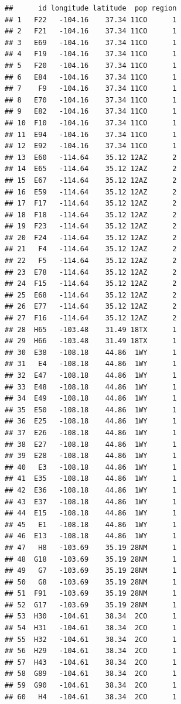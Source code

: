 \documentclass[]{article}
\begin{document}
\begin{verbatim}
##      id longitude latitude  pop region
## 1   F22   -104.16    37.34 11CO      1
## 2   F21   -104.16    37.34 11CO      1
## 3   E69   -104.16    37.34 11CO      1
## 4   F19   -104.16    37.34 11CO      1
## 5   F20   -104.16    37.34 11CO      1
## 6   E84   -104.16    37.34 11CO      1
## 7    F9   -104.16    37.34 11CO      1
## 8   E70   -104.16    37.34 11CO      1
## 9   E82   -104.16    37.34 11CO      1
## 10  F10   -104.16    37.34 11CO      1
## 11  E94   -104.16    37.34 11CO      1
## 12  E92   -104.16    37.34 11CO      1
## 13  E60   -114.64    35.12 12AZ      2
## 14  E65   -114.64    35.12 12AZ      2
## 15  E67   -114.64    35.12 12AZ      2
## 16  E59   -114.64    35.12 12AZ      2
## 17  F17   -114.64    35.12 12AZ      2
## 18  F18   -114.64    35.12 12AZ      2
## 19  F23   -114.64    35.12 12AZ      2
## 20  F24   -114.64    35.12 12AZ      2
## 21   F4   -114.64    35.12 12AZ      2
## 22   F5   -114.64    35.12 12AZ      2
## 23  E78   -114.64    35.12 12AZ      2
## 24  F15   -114.64    35.12 12AZ      2
## 25  E68   -114.64    35.12 12AZ      2
## 26  E77   -114.64    35.12 12AZ      2
## 27  F16   -114.64    35.12 12AZ      2
## 28  H65   -103.48    31.49 18TX      1
## 29  H66   -103.48    31.49 18TX      1
## 30  E38   -108.18    44.86  1WY      1
## 31   E4   -108.18    44.86  1WY      1
## 32  E47   -108.18    44.86  1WY      1
## 33  E48   -108.18    44.86  1WY      1
## 34  E49   -108.18    44.86  1WY      1
## 35  E50   -108.18    44.86  1WY      1
## 36  E25   -108.18    44.86  1WY      1
## 37  E26   -108.18    44.86  1WY      1
## 38  E27   -108.18    44.86  1WY      1
## 39  E28   -108.18    44.86  1WY      1
## 40   E3   -108.18    44.86  1WY      1
## 41  E35   -108.18    44.86  1WY      1
## 42  E36   -108.18    44.86  1WY      1
## 43  E37   -108.18    44.86  1WY      1
## 44  E15   -108.18    44.86  1WY      1
## 45   E1   -108.18    44.86  1WY      1
## 46  E13   -108.18    44.86  1WY      1
## 47   H8   -103.69    35.19 28NM      1
## 48  G18   -103.69    35.19 28NM      1
## 49   G7   -103.69    35.19 28NM      1
## 50   G8   -103.69    35.19 28NM      1
## 51  F91   -103.69    35.19 28NM      1
## 52  G17   -103.69    35.19 28NM      1
## 53  H30   -104.61    38.34  2CO      1
## 54  H31   -104.61    38.34  2CO      1
## 55  H32   -104.61    38.34  2CO      1
## 56  H29   -104.61    38.34  2CO      1
## 57  H43   -104.61    38.34  2CO      1
## 58  G89   -104.61    38.34  2CO      1
## 59  G90   -104.61    38.34  2CO      1
## 60   H4   -104.61    38.34  2CO      1

\end{verbatim}
\end{document}
